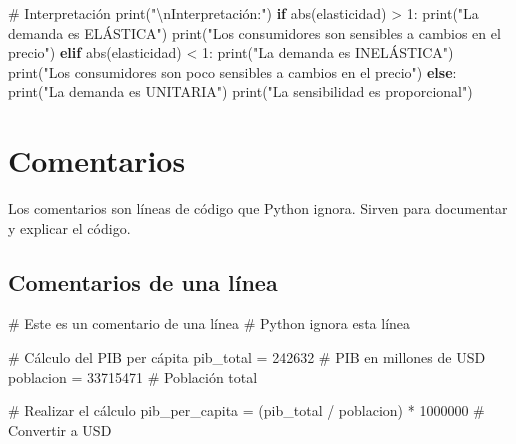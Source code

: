 \documentclass[
  doc,
  floatsintext,
  longtable,
  a4paper,
  nolmodern,
  notxfonts,
  notimes,
  12pt,
  colorlinks=true,linkcolor=blue,citecolor=blue,urlcolor=blue]{apa7}
\newenvironment{Shaded}{\begin{snugshade}}{\end{snugshade}}
\newcommand{\BuiltInTok}[1]{\textcolor[rgb]{0.00,0.23,0.31}{#1}}
\newcommand{\CharTok}[1]{\textcolor[rgb]{0.13,0.47,0.30}{#1}}
\newcommand{\CommentTok}[1]{\textcolor[rgb]{0.37,0.37,0.37}{#1}}
\newcommand{\ControlFlowTok}[1]{\textcolor[rgb]{0.00,0.23,0.31}{\textbf{#1}}}
\newcommand{\DecValTok}[1]{\textcolor[rgb]{0.68,0.00,0.00}{#1}}
\newcommand{\NormalTok}[1]{\textcolor[rgb]{0.00,0.23,0.31}{#1}}
\newcommand{\OperatorTok}[1]{\textcolor[rgb]{0.37,0.37,0.37}{#1}}
\newcommand{\StringTok}[1]{\textcolor[rgb]{0.13,0.47,0.30}{#1}}
\begin{document}
\begin{Shaded}
\begin{Highlighting}[]
\CommentTok{\# Interpretación}
\BuiltInTok{print}\NormalTok{(}\StringTok{"}\CharTok{\textbackslash{}n}\StringTok{Interpretación:"}\NormalTok{)}
\ControlFlowTok{if} \BuiltInTok{abs}\NormalTok{(elasticidad) }\OperatorTok{\textgreater{}} \DecValTok{1}\NormalTok{:}
    \BuiltInTok{print}\NormalTok{(}\StringTok{"La demanda es ELÁSTICA"}\NormalTok{)}
    \BuiltInTok{print}\NormalTok{(}\StringTok{"Los consumidores son sensibles a cambios en el precio"}\NormalTok{)}
\ControlFlowTok{elif} \BuiltInTok{abs}\NormalTok{(elasticidad) }\OperatorTok{\textless{}} \DecValTok{1}\NormalTok{:}
    \BuiltInTok{print}\NormalTok{(}\StringTok{"La demanda es INELÁSTICA"}\NormalTok{)}
    \BuiltInTok{print}\NormalTok{(}\StringTok{"Los consumidores son poco sensibles a cambios en el precio"}\NormalTok{)}
\ControlFlowTok{else}\NormalTok{:}
    \BuiltInTok{print}\NormalTok{(}\StringTok{"La demanda es UNITARIA"}\NormalTok{)}
    \BuiltInTok{print}\NormalTok{(}\StringTok{"La sensibilidad es proporcional"}\NormalTok{)}
\end{Highlighting}
\end{Shaded}

\section{Comentarios}\label{comentarios}

Los comentarios son líneas de código que Python ignora. Sirven para
documentar y explicar el código.

\subsection{Comentarios de una línea}\label{comentarios-de-una-luxednea}

\begin{Shaded}
\begin{Highlighting}[]
\CommentTok{\# Este es un comentario de una línea}
\CommentTok{\# Python ignora esta línea}

\CommentTok{\# Cálculo del PIB per cápita}
\NormalTok{pib\_total }\OperatorTok{=} \DecValTok{242632}  \CommentTok{\# PIB en millones de USD}
\NormalTok{poblacion }\OperatorTok{=} \DecValTok{33715471}  \CommentTok{\# Población total}

\CommentTok{\# Realizar el cálculo}
\NormalTok{pib\_per\_capita }\OperatorTok{=}\NormalTok{ (pib\_total }\OperatorTok{/}\NormalTok{ poblacion) }\OperatorTok{*} \DecValTok{1000000}  \CommentTok{\# Convertir a USD}
\end{Highlighting}
\end{Shaded}
\end{document}
